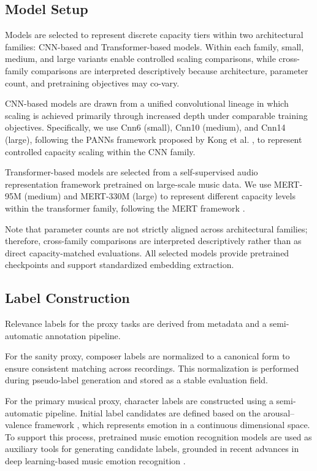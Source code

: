 \documentclass{article}
\begin{document}
\subsection{Model Setup}

Models are selected to represent discrete capacity tiers within two architectural families: CNN-based
and Transformer-based models. Within each family, small, medium, and large variants enable controlled
scaling comparisons, while cross-family comparisons are interpreted descriptively because
architecture, parameter count, and pretraining objectives may co-vary.

CNN-based models are drawn from a unified convolutional lineage in which scaling is achieved
primarily through increased depth under comparable training objectives. 
Specifically, we use Cnn6 (small), Cnn10 (medium), and Cnn14 (large), following the PANNs framework proposed by Kong et al. \cite{kong2020panns}, to represent controlled capacity scaling within the CNN family.

Transformer-based models are selected from a self-supervised audio representation framework
pretrained on large-scale music data. 
We use MERT-95M (medium) and MERT-330M (large) 
to represent different capacity levels within the transformer family, 
following the MERT framework \cite{li2023mert}.

Note that parameter counts are not strictly aligned across architectural families; therefore, cross-family comparisons are interpreted descriptively rather than as direct capacity-matched evaluations.
All selected models provide pretrained checkpoints and support standardized embedding extraction.

\subsection{Label Construction}

Relevance labels for the proxy tasks are derived from metadata and a semi-automatic annotation pipeline.

For the sanity proxy, composer labels are normalized to a canonical form to ensure consistent
matching across recordings. This normalization is performed during pseudo-label generation and
stored as a stable evaluation field.

For the primary musical proxy, character labels are constructed using a semi-automatic pipeline.
Initial label candidates are defined based on the arousal–valence framework 
\cite{eerola2011}, which represents emotion in a continuous dimensional space. 
To support this process, pretrained music emotion recognition models are used as auxiliary tools 
for generating candidate labels, grounded in recent advances in deep learning-based music emotion recognition \cite{jiang2024}.
\end{document}
